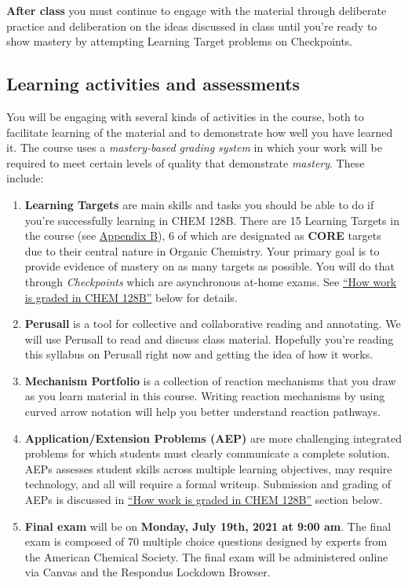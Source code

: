 \textbf{After class} you must continue to engage with the material
through deliberate practice and deliberation on the ideas discussed in
class until you're ready to show mastery by attempting Learning Target
problems on Checkpoints.

\hypertarget{learning-activities-and-assessments}{%
\subsection{Learning activities and
assessments}\label{learning-activities-and-assessments}}

You will be engaging with several kinds of activities in the course,
both to facilitate learning of the material and to demonstrate how well
you have learned it. The course uses a \emph{mastery-based grading
system} in which your work will be required to meet certain levels of
quality that demonstrate \emph{mastery}. These include:

\begin{enumerate}
\def\labelenumi{\arabic{enumi}.}
\tightlist
\item
  \textbf{Learning Targets} are main skills and tasks you should be able
  to do if you're successfully learning in CHEM 128B. There are 15
  Learning Targets in the course (see
  \protect\hyperlink{appendix-a}{Appendix B}), 6 of which are designated
  as \textbf{CORE} targets due to their central nature in Organic
  Chemistry. Your primary goal is to provide evidence of mastery on as
  many targets as possible. You will do that through \emph{Checkpoints}
  which are asynchronous at-home exams. See
  \protect\hyperlink{grading}{``How work is graded in CHEM 128B''} below
  for details.
\item
  \textbf{Perusall} is a tool for collective and collaborative reading
  and annotating. We will use Perusall to read and discuss class
  material. Hopefully you're reading this syllabus on Perusall right now
  and getting the idea of how it works.
\item
  \textbf{Mechanism Portfolio} is a collection of reaction mechanisms
  that you draw as you learn material in this course. Writing reaction
  mechanisms by using curved arrow notation will help you better
  understand reaction pathways.
\item
  \textbf{Application/Extension Problems (AEP)} are more challenging
  integrated problems for which students must clearly communicate a
  complete solution. AEPs assesses student skills across multiple
  learning objectives, may require technology, and all will require a
  formal writeup. Submission and grading of AEPs is discussed in
  \protect\hyperlink{grading}{``How work is graded in CHEM 128B''}
  section below.
\item
  \textbf{Final exam} will be on \textbf{Monday, July 19th, 2021 at 9:00
  am}. The final exam is composed of 70 multiple choice questions
  designed by experts from the American Chemical Society. The final exam
  will be administered online via Canvas and the Respondus Lockdown
  Browser.
\end{enumerate}

